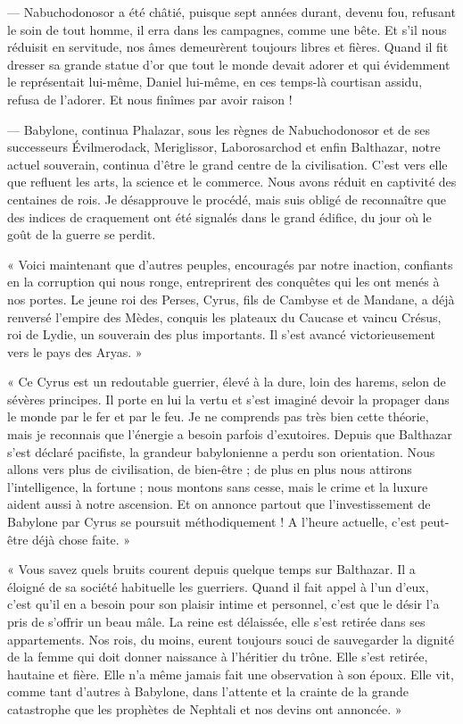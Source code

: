 \documentclass[a4paper, 11pt, oneside, polutonikogreek, french]{article}
\begin{document}
--- Nabuchodonosor a été châtié, puisque sept années durant, devenu fou, refusant le soin de tout homme, il erra dans les campagnes, comme une bête. Et s'il nous réduisit en servitude, nos âmes demeurèrent toujours libres et fières. Quand il fit dresser sa grande statue d'or que tout le monde devait adorer et qui évidemment le représentait lui-même, Daniel lui-même, en ces temps-là courtisan assidu, refusa de l'adorer. Et nous finîmes par avoir raison !

--- Babylone, continua Phalazar, sous les règnes de Nabuchodonosor et de ses successeurs Évilmerodack, Meriglissor, Laborosarchod et enfin Balthazar, notre actuel souverain, continua d'être le grand centre de la civilisation. C'est vers elle que refluent les arts, la science et le commerce. Nous avons réduit en captivité des centaines de rois. Je désapprouve le procédé, mais suis obligé de reconnaître que des indices de craquement ont été signalés dans le grand édifice, du jour où le goût de la guerre se perdit.

« Voici maintenant que d'autres peuples, encouragés par notre inaction, confiants en la corruption qui nous ronge, entreprirent des conquêtes qui les ont menés à nos portes. Le jeune roi des Perses, Cyrus, fils de Cambyse et de Mandane, a déjà renversé l'empire des Mèdes, conquis les plateaux du Caucase et vaincu Crésus, roi de Lydie, un souverain des plus importants. Il s'est avancé victorieusement vers le pays des Aryas. »

« Ce Cyrus est un redoutable guerrier, élevé à la dure, loin des harems, selon de sévères principes. Il porte en lui la vertu et s'est imaginé devoir la propager dans le monde par le fer et par le feu. Je ne comprends pas très bien cette théorie, mais je reconnais que l'énergie a besoin parfois d'exutoires. Depuis que Balthazar s'est déclaré pacifiste, la grandeur babylonienne a perdu son orientation. Nous allons vers plus de civilisation, de bien-être ; de plus en plus nous attirons l'intelligence, la fortune ; nous montons sans cesse, mais le crime et la luxure aident aussi à notre ascension. Et on annonce partout que l'investissement de Babylone par Cyrus se poursuit méthodiquement ! A l'heure actuelle, c'est peut-être déjà chose faite. »

\bigskip
\centerline{\EightStarTaper}
\centerline{\EightStarTaper\EightStarTaper}
\bigskip

« Vous savez quels bruits courent depuis quelque temps sur Balthazar. Il a éloigné de sa société habituelle les guerriers. Quand il fait appel à l'un d'eux, c'est qu'il en a besoin pour son plaisir intime et personnel, c'est que le désir l'a pris de s'offrir un beau mâle. La reine est délaissée, elle s'est retirée dans ses appartements. Nos rois, du moins, eurent toujours souci de sauvegarder la dignité de la femme qui doit donner naissance à l'héritier du trône. Elle s'est retirée, hautaine et fière. Elle n'a même jamais fait une observation à son époux. Elle vit, comme tant d'autres à Babylone, dans l'attente et la crainte de la grande catastrophe que les prophètes de Nephtali et nos devins ont annoncée. »
\end{document}
